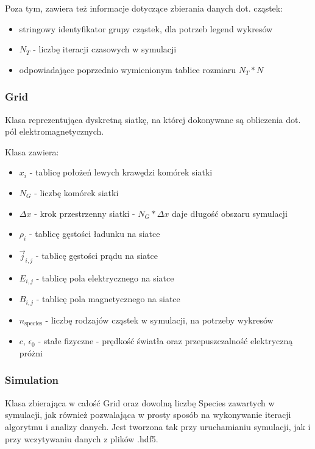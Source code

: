 Poza tym, zawiera też informacje dotyczące zbierania danych dot. cząstek:
\begin{itemize}
    \item stringowy identyfikator grupy cząstek, dla potrzeb legend wykresów
    \item $N_T$ - liczbę iteracji czasowych w symulacji
    \item odpowiadające poprzednio wymienionym tablice rozmiaru $N_T * N$
\end{itemize}


\subsubsection{Grid}
Klasa reprezentująca dyskretną siatkę, na której dokonywane są obliczenia dot. pól elektromagnetycznych.

Klasa zawiera:
\begin{itemize}
    \item $x_i$ - tablicę położeń lewych krawędzi komórek siatki
    \item $N_G$ - liczbę komórek siatki
    \item $\Delta x$ - krok przestrzenny siatki - $N_G * \Delta x$ daje długość obszaru symulacji
    \item $\rho_i$ - tablicę gęstości ładunku na siatce
    \item $\vec{j}_{i,j}$ - tablicę gęstości prądu na siatce
    \item $E_{i,j}$ - tablicę pola elektrycznego na siatce
    \item $B_{i,j}$ - tablicę pola magnetycznego na siatce
    \item $n_{\text{species}}$ - liczbę rodzajów cząstek w symulacji, na potrzeby wykresów
    \item $c$, $\epsilon_0$ - stałe fizyczne - prędkość światła oraz przepuszczalność elektryczną próżni %
\end{itemize}



\subsubsection{Simulation}
Klasa zbierająca w całość Grid oraz dowolną liczbę Species zawartych w symulacji, jak również
pozwalająca w prosty sposób na wykonywanie iteracji algorytmu i analizy danych. Jest tworzona tak przy
uruchamianiu symulacji, jak i przy wczytywaniu danych z plików .hdf5.

